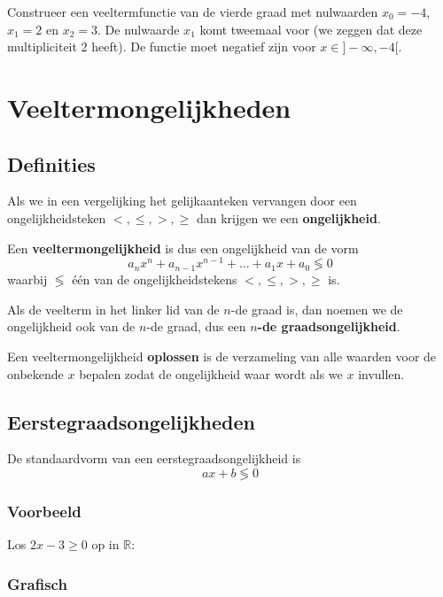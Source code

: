\documentclass[12pt,twoside,a4paper]{article}
\begin{document}
\begin{oefening}
Construeer een veeltermfunctie van de vierde graad met nulwaarden $x_0=-4$, $x_1=2$ en $x_2=3$. De nulwaarde $x_1$ komt tweemaal voor (we zeggen dat deze multipliciteit 2 heeft). De functie moet negatief zijn voor $x\in]-\infty,-4[$.
\end{oefening}

\cleardoublepage
\section{Veeltermongelijkheden}

\subsection{Definities}

Als we in een vergelijking het gelijkaanteken vervangen door een ongelijkheidsteken $<, \leq, >, \geq$ dan krijgen we een {\bf ongelijkheid}.

Een {\bf veeltermongelijkheid} is dus een ongelijkheid van de vorm
\[a_nx^n+a_{n-1}x^{n-1}+ \ldots + a_1x+a_0 \lessgtr 0 \]
waarbij $\lessgtr$ één van de ongelijkheidstekens $<, \leq, >, \geq$ is.

Als de veelterm in het linker lid van de $n$-de graad is, dan noemen we de ongelijkheid ook van de $n$-de graad, dus een {\bf $n$-de graadsongelijkheid}.

Een veeltermongelijkheid {\bf oplossen} is de verzameling van alle waarden voor de onbekende $x$ bepalen zodat de ongelijkheid waar wordt als we $x$ invullen.

\subsection{Eerstegraadsongelijkheden}

De standaardvorm van een eerstegraadsongelijkheid is
\[ax + b \lessgtr 0\]

\subsubsection*{Voorbeeld}

Los $2x-3 \geq 0$ op in $\mathbb{R}$:

\subsubsection*{Grafisch}
\end{document}
